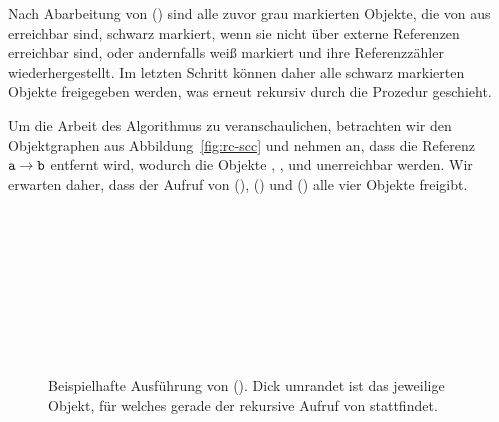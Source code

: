 Nach Abarbeitung von () sind alle zuvor grau markierten Objekte, die von  aus erreichbar sind, schwarz markiert, wenn sie nicht über externe Referenzen erreichbar sind, oder andernfalls weiß markiert und ihre Referenzzähler wiederhergestellt.
Im letzten Schritt können daher alle schwarz markierten Objekte freigegeben werden, was erneut rekursiv durch die Prozedur  geschieht.

Um die Arbeit des Algorithmus zu veranschaulichen, betrachten wir den Objektgraphen aus Abbildung~\ref{fig:rc-scc} und nehmen an, dass die Referenz $\texttt{a} \rightarrow \texttt{b}$ entfernt wird, wodurch die Objekte , ,  und  unerreichbar werden.
Wir erwarten daher, dass der Aufruf von (), () und () alle vier Objekte freigibt.

\begin{figure}[h]
	\centering
	\begin{subfigure}{0.4\textwidth}
		\centering
		
	\end{subfigure}~\hspace{0.5cm}~
	\begin{subfigure}{0.473\textwidth}
		\centering
		
	\end{subfigure}\\[1cm]
	\begin{subfigure}{0.4\textwidth}
		\centering
		
	\end{subfigure}~\hspace{0.5cm}~
	\begin{subfigure}{0.4\textwidth}
		\centering
		
	\end{subfigure}\\[1cm]
	\begin{subfigure}{0.4\textwidth}
		\centering
		
	\end{subfigure}~\hspace{0.5cm}~
	\begin{subfigure}{0.4\textwidth}
		\centering
		
	\end{subfigure}
	\caption[Ausführung von ()]{Beispielhafte Ausführung von (). Dick umrandet ist das jeweilige Objekt, für welches gerade der rekursive Aufruf von  stattfindet.}
	\label{fig:rc-markgray-example}
\end{figure}

